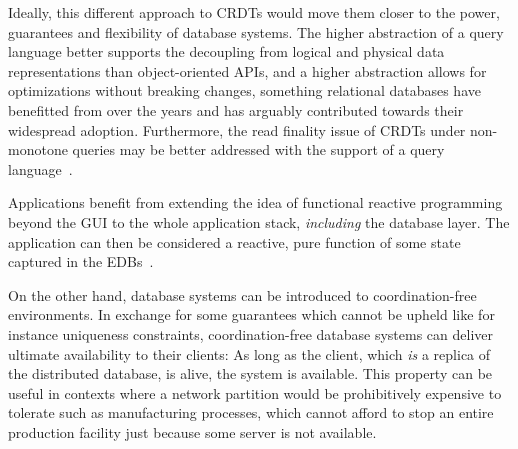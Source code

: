 \documentclass{article}
\begin{document}
Ideally, this different approach to CRDTs would move them closer to the power,
guarantees and flexibility of database systems.
The higher abstraction of a query language better supports the decoupling from
logical and physical data representations than object-oriented APIs,
and a higher abstraction allows for optimizations without breaking changes,
something relational databases have benefitted from over the years and has
arguably contributed towards their widespread adoption.
Furthermore, the read finality issue of CRDTs under non-monotone queries
may be better addressed with the support of a query language~\cite{laddad2022keep}.

Applications benefit from extending the idea of functional reactive programming
beyond the GUI to the whole application stack,
\emph{including} the database layer.
The application can then be considered a reactive, pure function
of some state captured in the EDBs~\cite{schiefer2022building}.

On the other hand, database systems can be introduced to coordination-free
environments.
In exchange for some guarantees which cannot be upheld
like for instance uniqueness constraints,
coordination-free database systems can deliver ultimate availability
to their clients:
As long as the client, which \emph{is} a replica of the distributed database,
is alive, the system is available.
This property can be useful in contexts where a network partition would be
prohibitively expensive to tolerate such as manufacturing processes,
which cannot afford to stop an entire production facility just because
some server is not available.
\end{document}
